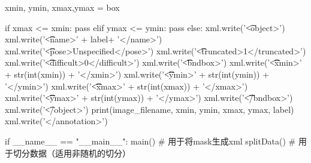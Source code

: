 \begin{python}
                    xmin, ymin, xmax,ymax = box

                    if xmax <= xmin:
                        pass
                    elif ymax <= ymin:
                        pass
                    else:
                        xml.write('\t<object>\n')
                        xml.write('\t\t<name>' + label+ '</name>\n')
                        xml.write('\t\t<pose>Unspecified</pose>\n')
                        xml.write('\t\t<truncated>1</truncated>\n')
                        xml.write('\t\t<difficult>0</difficult>\n')
                        xml.write('\t\t<bndbox>\n')
                        xml.write('\t\t\t<xmin>' + str(int(xmin)) + '</xmin>\n')
                        xml.write('\t\t\t<ymin>' + str(int(ymin)) + '</ymin>\n')
                        xml.write('\t\t\t<xmax>' + str(int(xmax)) + '</xmax>\n')
                        xml.write('\t\t\t<ymax>' + str(int(ymax)) + '</ymax>\n')
                        xml.write('\t\t</bndbox>\n')
                        xml.write('\t</object>\n')
                        print(image_filename, xmin, ymin, xmax, ymax, label)
                xml.write('</annotation>')

if __name__ == "__main__":
    main()  # 用于将mask生成xml
    splitData() # 用于切分数据（适用非随机的切分）



\end{python}